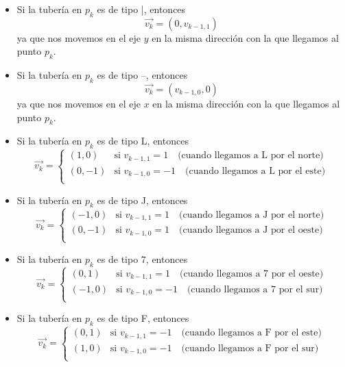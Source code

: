 \documentclass[a4paper,12pt]{article}
\begin{document}
\begin{itemize}
    \item Si la tubería en $p_k$ es de tipo |, entonces 
    $$\vec{v_k}=(0, v_{k-1,1})$$
    ya que nos movemos en el eje $y$ en la misma dirección con la que llegamos al punto $p_k$.
    
    \item Si la tubería en $p_k$ es de tipo --, entonces
    $$\vec{v_k}=(v_{k-1,0}, 0)$$
    ya que nos movemos en el eje $x$ en la misma dirección con la que llegamos al punto $p_k$.

    \item Si la tubería en $p_k$ es de tipo L, entonces
    $$\vec{v_k}=\begin{cases}
        (1, 0) & \text{si } v_{k-1,1} = 1   \quad \text{(cuando llegamos a L por el norte)}\\
        (0, -1) & \text{si } v_{k-1,0} = -1  \quad \text{(cuando llegamos a L por el este)}\\
    \end{cases}$$

    \item Si la tubería en $p_k$ es de tipo J, entonces
    $$\vec{v_k}=\begin{cases}
        (-1, 0) & \text{si } v_{k-1,1} = 1   \quad \text{(cuando llegamos a J por el norte)}\\
        (0, -1) & \text{si } v_{k-1,0} = 1  \quad \text{(cuando llegamos a J por el oeste)}\\
    \end{cases}$$

    \item Si la tubería en $p_k$ es de tipo 7, entonces
    $$\vec{v_{k}}=\begin{cases}
        (0, 1) & \text{si } v_{k-1,1} = 1   \quad \text{(cuando llegamos a 7 por el oeste)}\\
        (-1, 0) & \text{si } v_{k-1,0} = -1  \quad \text{(cuando llegamos a 7 por el sur)}\\
    \end{cases}$$

    \item Si la tubería en $p_k$ es de tipo F, entonces
    $$\vec{v_k}=\begin{cases}
        (0, 1) & \text{si } v_{k-1,1} = -1   \quad \text{(cuando llegamos a F por el este)}\\
        (1, 0) & \text{si } v_{k-1,0} = -1  \quad \text{(cuando llegamos a F por el sur)}\\
    \end{cases}$$
\end{itemize}
\end{document}
